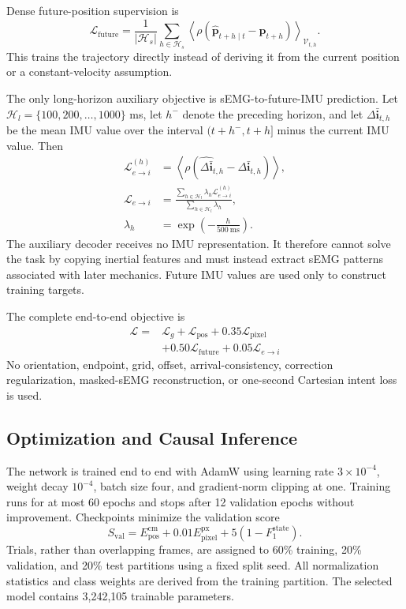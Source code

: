 Dense future-position supervision is
\begin{equation}
 \mathcal L_{\mathrm{future}}=
 \frac{1}{|\mathcal H_s|}
 \sum_{h\in\mathcal H_s}
 \left\langle
 \rho(\hat{\mathbf p}_{t+h\mid t}-\mathbf p_{t+h})
 \right\rangle_{\mathcal V_{t,h}}.
\end{equation}
This trains the trajectory directly instead of deriving it from the current
position or a constant-velocity assumption.

The only long-horizon auxiliary objective is sEMG-to-future-IMU prediction. Let
$\mathcal H_l=\{100,200,\ldots,1000\}$ ms, let $h^{-}$ denote the preceding
horizon, and let $\Delta\bar{\mathbf i}_{t,h}$ be the mean IMU value over the
interval $(t+h^{-},t+h]$ minus the current IMU value. Then
\begin{align}
 \mathcal L_{e\rightarrow i}^{(h)}
 &=\left\langle\rho\!\left(
 \widehat{\Delta\bar{\mathbf i}}_{t,h}
 -\Delta\bar{\mathbf i}_{t,h}\right)\right\rangle,\\
 \mathcal L_{e\rightarrow i}
 &=\frac{\sum_{h\in\mathcal H_l}\lambda_h
 \mathcal L_{e\rightarrow i}^{(h)}}
 {\sum_{h\in\mathcal H_l}\lambda_h},\\
 \lambda_h&=\exp\!\left(-\frac{h}{500\ \mathrm{ms}}\right).
\end{align}
The auxiliary decoder receives no IMU representation. It therefore cannot
solve the task by copying inertial features and must instead extract sEMG
patterns associated with later mechanics. Future IMU values are used only to
construct training targets.

The complete end-to-end objective is
\begin{equation}
 \boxed{\begin{aligned}
 \mathcal L={}&\mathcal L_g+\mathcal L_{\mathrm{pos}}
 +0.35\mathcal L_{\mathrm{pixel}}\\
 &+0.50\mathcal L_{\mathrm{future}}
 +0.05\mathcal L_{e\rightarrow i}
 \end{aligned}}
\end{equation}
No orientation, endpoint, grid, offset, arrival-consistency, correction
regularization, masked-sEMG reconstruction, or one-second Cartesian intent
loss is used.

\subsection{Optimization and Causal Inference}

The network is trained end to end with AdamW using learning rate
$3\times10^{-4}$, weight decay $10^{-4}$, batch size four, and gradient-norm
clipping at one. Training runs for at most 60 epochs and stops after 12
validation epochs without improvement. Checkpoints minimize the validation
score
\begin{equation}
 S_{\mathrm{val}}=E_{\mathrm{pos}}^{\mathrm{cm}}
 +0.01E_{\mathrm{pixel}}^{\mathrm{px}}
 +5(1-F_1^{\mathrm{state}}).
\end{equation}
Trials, rather than overlapping frames, are assigned to 60\% training, 20\%
validation, and 20\% test partitions using a fixed split seed. All
normalization statistics and class weights are derived from the training
partition. The selected model contains 3,242,105 trainable parameters.

